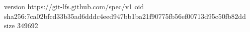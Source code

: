 version https://git-lfs.github.com/spec/v1
oid sha256:7ca02bfcd33b35ad6dddc4eed947bb1ba21f90775fb56ef00713d95c50fb82dd
size 349692
